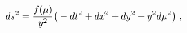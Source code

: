 \begin{equation}
ds^2 = {f(\mu)\over y^2} 
 \big( -dt^2 + d\vec{x}^2 +dy^2 +y^2 d\mu^2\big)\ ,
 \label{poincare}
\end{equation}

